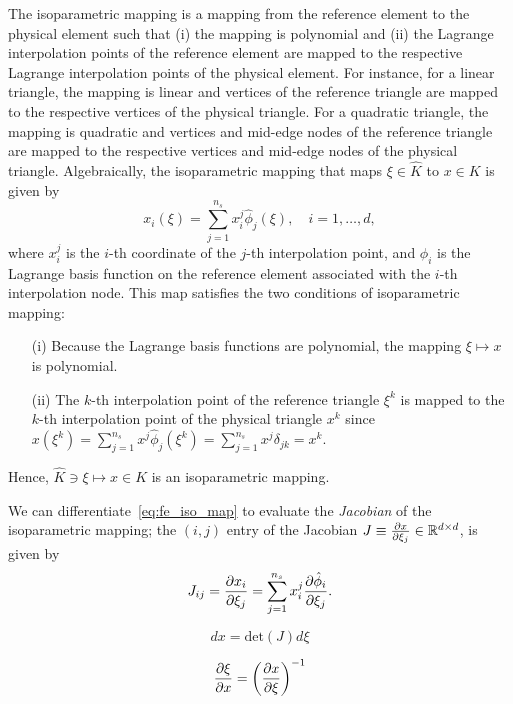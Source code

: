 The isoparametric mapping is a mapping from the reference element to the physical element such that (i) the mapping is polynomial and (ii) the Lagrange interpolation points of the reference element are mapped to the respective Lagrange interpolation points of the physical element. For instance, for a linear triangle, the mapping is linear and vertices of the reference triangle are mapped to the respective vertices of the physical triangle.  For a quadratic triangle, the mapping is quadratic and vertices and mid-edge nodes of the reference triangle are mapped to the respective vertices and mid-edge nodes of the physical triangle. Algebraically, the isoparametric mapping that maps $\xi \in \hat K$ to $x \in K$ is given by
\begin{equation}
  x_i(\xi) = \sum_{j=1}^{n_s} x^j_i \hat \phi_j(\xi), \quad i = 1,\dots,d,
  \label{eq:fe_iso_map}
\end{equation}
where $x_i^j$ is the $i$-th coordinate of the $j$-th interpolation point, and $\hat \phi_i$ is the Lagrange basis function on the reference element associated with the $i$-th interpolation node. This map satisfies the two conditions of isoparametric mapping:
\begin{itemize}
\item[(i)] Because the Lagrange basis functions are polynomial, the mapping $\xi \mapsto x$ is polynomial.
\item[(ii)] The $k$-th interpolation point of the reference triangle $\xi^k$ is mapped to the $k$-th interpolation point of the physical triangle $x^k$ since $x(\xi^k) = \sum_{j=1}^{n_s} x^j \hat \phi_j(\xi^k) = \sum_{j=1}^{n_s} x^j \delta_{jk} = x^k$.
\end{itemize}
Hence, $\hat K \ni \xi \mapsto x \in K$ is an isoparametric mapping.

We can differentiate~\eqref{eq:fe_iso_map} to evaluate the \emph{Jacobian} of the isoparametric mapping; the $(i,j)$ entry of the Jacobian $J \equiv \frac{\partial x}{\partial \xi_j} \in \mathbb{R}^{d \times d}$, is given by
\begin{equation*}
  J_{ij} = \frac{\partial x_i}{\partial \xi_j} = \sum_{j=1}^{n_s} x^j_i \frac{\partial \hat \phi_i}{\partial \xi_j} .
\end{equation*}

\begin{equation*}
  dx = \text{det}(J) d\xi
\end{equation*}

\begin{equation*}
  \frac{\partial \xi}{\partial x} = \left( \frac{\partial x}{\partial \xi} \right)^{-1}
\end{equation*}

